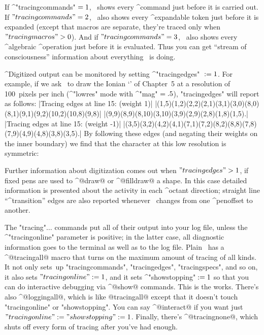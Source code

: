 \danger If ^"tracingcommands"$\null=1$, \MF\ shows every ^{command}
just before it is carried out. If $"tracingcommands"=2$, \MF\ also shows
every ^{ex\-pand\-able token} just before it is expanded (except that
macros are separate, they're traced only when $"tracingmacros">0$). And if
$"tracingcommands"=3$, \MF\ also shows every ^{algebraic} ^{operation}
just before it is evaluated. Thus you can get ``stream of
consciousness'' information about everything \MF\ is doing.

\begingroup\ninepoint
\danger ^{Digitized output} can be monitored by setting ^"tracingedges"%
$\null:=1$. For example, if we ask \MF\ to draw the Ionian `{\manual\IOO}'
of Chapter~5 at a resolution of 100~pixels per inch (^"lowres" mode
with ^"mag"$\null=.5$), "tracingedges" will report as follows:\enddanger
\beginlines
|Tracing edges at line 15: (weight 1)|
|(1,5)(1,2)(2,2)(2,1)(3,1)(3,0)(8,0)(8,1)(9,1)(9,2)(10,2)(10,8)(9,8)|
|(9,9)(8,9)(8,10)(3,10)(3,9)(2,9)(2,8)(1,8)(1,5).|
\smallskip
|Tracing edges at line 15: (weight -1)|
|(3,5)(3,2)(4,2)(4,1)(7,1)(7,2)(8,2)(8,8)(7,8)(7,9)(4,9)(4,8)(3,8)(3,5).|
\endlines
By following these edges (and negating their weights on the inner boundary)
we find that the character at this low resolution is symmetric:
\begindisplay
\vbox{\offinterlineskip\manual{}}
\enddisplay

\endgroup
\ddanger Further information about digitization comes out when
$"tracingedges">1$, if fixed pens are used to ^@draw@ or ^@filldraw@ a
shape. In this case detailed information is presented about the activity
in each ^{octant} direction; straight line ``^{transition}'' edges are
also reported whenever \MF\ changes from one ^{penoffset} to another.

\ddanger The "tracing"$\ldots$ commands put all of their output into your log
file, unless the ^"tracingonline" parameter is positive; in the latter
case, all diagnostic information goes to the terminal as well as to the
log file.  Plain \MF\ has a ^@tracingall@ macro that turns on the
maximum amount of tracing of all kinds. It not only sets~up
"tracingcommands", "tracingedges", "tracingspecs", and so on,
it also sets $"tracingonline":=1$, and it sets ^"showstopping"$\null:=1$ so
that you can do interactive debugging via ^@show@ commands. This is the works.
There's also ^@loggingall@, which is like @tracingall@ except that it
doesn't touch "tracingonline" or "showstopping". You can say ^@interact@
if you want just $"tracingonline":="showstopping":=1$. Finally, there's
^@tracingnone@, which shuts off every form of tracing after you've had enough.


